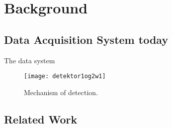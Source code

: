 \chapter{Background}

\section{Data Acquisition System today}
The data system

\begin{figure}
\centering
\texttt{[image: detektor1og2w1]}
\caption{Mechanism of detection.\cite{Detector}}
\label{f:detector}
\end{figure}


\section{Related Work}
